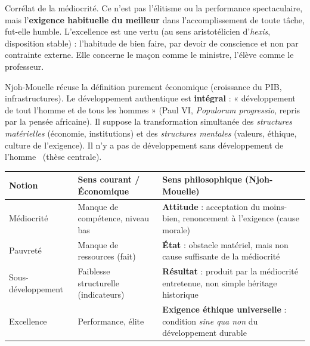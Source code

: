 \documentclass[11pt]{article}
\newcommand{\cle}[1]{{\popxbold\color{popdark}#1}}
\begin{document}
\begin{definition}[Excellence]
Corrélat de la médiocrité. Ce n'est pas l'élitisme ou la performance spectaculaire, mais l'\textbf{exigence habituelle du meilleur} dans l'accomplissement de toute tâche, fut-elle humble. L'excellence est une \cle{vertu} (au sens aristotélicien d'\emph{hexis}, disposition stable) : l'habitude de bien faire, par devoir de conscience et non par contrainte externe. Elle concerne le maçon comme le ministre, l'élève comme le professeur.
\end{definition}

\begin{definition}
Njoh-Mouelle récuse la définition purement économique (croissance du PIB, infrastructures). Le développement authentique est \textbf{intégral} : « développement de tout l'homme et de tous les hommes » (Paul VI, \emph{Populorum progressio}, repris par la pensée africaine). Il suppose la transformation simultanée des \emph{structures matérielles} (économie, institutions) et des \emph{structures mentales} (valeurs, éthique, culture de l'exigence). \guillemotleft Il n'y a pas de développement sans développement de l'homme \guillemotright\ (thèse centrale).
\end{definition}

\begin{aretenir}
\begin{center}
\begin{tabularx}{\linewidth}{|l|X|X|}\hline
\rowcolor{popblueL}
\textbf{Notion} & \textbf{Sens courant / Économique} & \textbf{Sens philosophique (Njoh-Mouelle)} \\\hline
Médiocrité & Manque de compétence, niveau bas & \textbf{Attitude} : acceptation du moins-bien, renoncement à l'exigence (cause morale) \\\hline
Pauvreté & Manque de ressources (fait) & \textbf{État} : obstacle matériel, mais non cause suffisante de la médiocrité \\\hline
Sous-développement & Faiblesse structurelle (indicateurs) & \textbf{Résultat} : produit par la médiocrité entretenue, non simple héritage historique \\\hline
Excellence & Performance, élite & \textbf{Exigence éthique universelle} : condition \emph{sine qua non} du développement durable \\\hline
\end{tabularx}
\end{center}
\end{aretenir}
\end{document}
